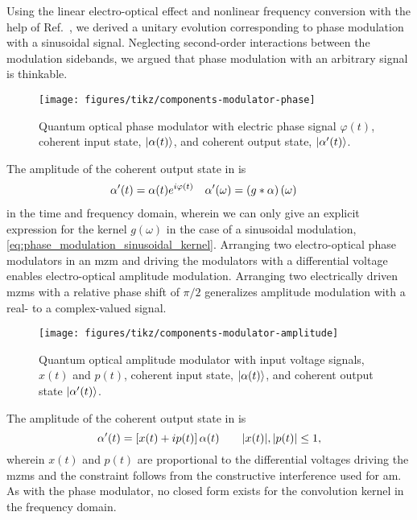 Using the linear electro-optical effect and nonlinear frequency conversion with the help of Ref.~\cite{Horoshko2018,QuesadaMejia2015}, we derived a unitary evolution corresponding to phase modulation with a sinusoidal signal.
Neglecting second-order interactions between the modulation sidebands, we argued that phase modulation with an arbitrary signal is thinkable.
\begin{figure}[htb]
    \centering
    \texttt{[image: figures/tikz/components-modulator-phase]}
    \caption{Quantum optical phase modulator with electric phase signal $\varphi(t)$, coherent input state, $\lvert\alpha(t)\rangle$, and coherent output state, $\lvert\alpha^\prime(t)\rangle$.}\label{fig:components_modulator_phase}
\end{figure}
The amplitude of the coherent output state in  is
\begin{align}
	\alpha^\prime(t)
	&=
	\alpha(t)
	e^{i\varphi(t)}
	&
	\alpha^\prime(\omega)
	&=
	\left(g\ast\alpha\right)(\omega)
\end{align}
in the time and frequency domain, wherein we can only give an explicit expression for the kernel $g(\omega)$ in the case of a sinusoidal modulation, \cref{eq:phase_modulation_sinusoidal_kernel}.
Arranging two electro-optical phase modulators in an \gls{mzm} and driving the modulators with a differential voltage enables electro-optical amplitude modulation.
Arranging two electrically driven \gls{mzm}s with a relative phase shift of $\pi/2$ generalizes amplitude modulation with a real- to a complex-valued signal.
\begin{figure}[htb]
    \centering
    \texttt{[image: figures/tikz/components-modulator-amplitude]}
    \caption{Quantum optical amplitude modulator with input voltage signals, $x(t)$ and $p(t)$, coherent input state, $\lvert\alpha(t)\rangle$, and coherent output state $\lvert\alpha^\prime(t)\rangle$.}\label{fig:components_modulator_phase}
\end{figure}
The amplitude of the coherent output state in  is
\begin{equation}
	\alpha^\prime(t)
	=
	\left[
		x(t)
		+
		ip(t)
	\right]
	\alpha(t)
	\qquad
	\lvert x(t)\rvert,
	\lvert p(t)\rvert
	\leq
	1
	,
\end{equation}
wherein $x(t)$ and $p(t)$ are proportional to the differential voltages driving the \gls{mzm}s and the constraint follows from the constructive interference used for \gls{am}.
As with the phase modulator, no closed form exists for the convolution kernel in the frequency domain.

